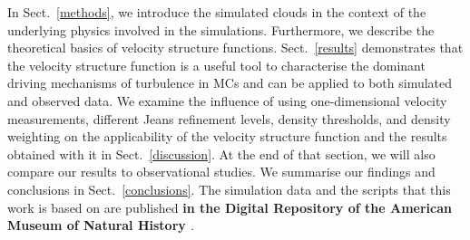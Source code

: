 In Sect.~\ref{methods}, we introduce the simulated clouds in the context of the underlying physics involved in the simulations.
Furthermore, we describe the theoretical basics of velocity structure functions.
Sect.~\ref{results} demonstrates that the velocity structure function is a useful tool to characterise the dominant driving mechanisms of turbulence in MCs and can be applied to both simulated and observed data. 
We examine the influence of using one-dimensional velocity measurements, different Jeans refinement levels, density thresholds, and density weighting on the applicability of the velocity structure function and the results obtained with it in Sect.~\ref{discussion}.  
At the end of that section, we will also compare our results to observational studies.
We summarise our findings and conclusions in Sect.~\ref{conclusions}.
The simulation data and the scripts that this work is based on are published \textbf{in the Digital Repository of the American Museum of Natural History \citep{Chira2018b}}.




\endinput
